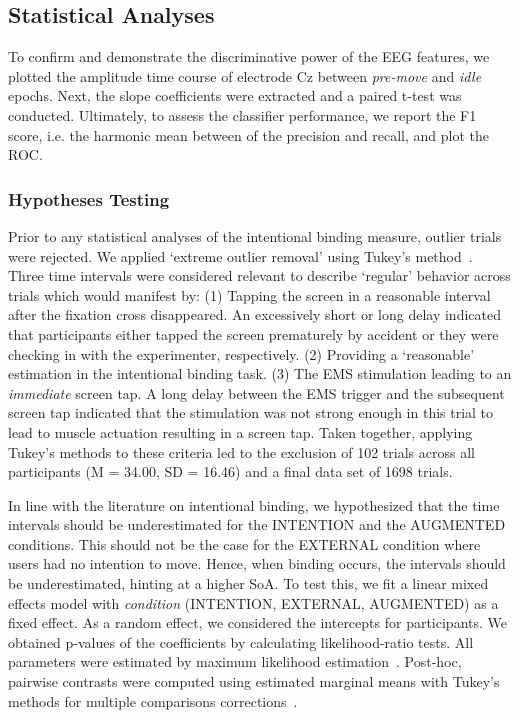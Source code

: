 \subsection{Statistical Analyses}
To confirm and demonstrate the discriminative power of the EEG features, we plotted the amplitude time course of electrode Cz between \textit{pre-move} and \textit{idle} epochs. Next, the slope coefficients were extracted and a paired t-test was conducted. Ultimately, to assess the classifier performance, we report the F1 score, i.e. the harmonic mean between of the precision and recall, and plot the ROC.

\subsubsection{Hypotheses Testing}
Prior to any statistical analyses of the intentional binding measure, outlier trials were rejected. We applied `extreme outlier removal' using Tukey's method~\cite{Tukey1949-sl}. Three time intervals were considered relevant to describe `regular' behavior across trials which would manifest by: (1) Tapping the screen in a reasonable interval after the fixation cross disappeared. An excessively short or long delay indicated that participants either tapped the screen prematurely by accident or they were checking in with the experimenter, respectively. (2) Providing a `reasonable' estimation in the intentional binding task. (3) The EMS stimulation leading to an \textit{immediate} screen tap. A long delay between the EMS trigger and the subsequent screen tap indicated that the stimulation was not strong enough in this trial to lead to muscle actuation resulting in a screen tap. Taken together, applying Tukey's methods to these criteria led to the exclusion of 102 trials across all participants (M = 34.00, SD = 16.46) and a final data set of 1698 trials.

In line with the literature on intentional binding, we hypothesized that the time intervals should be underestimated for the INTENTION and the AUGMENTED conditions. This should not be the case for the EXTERNAL condition where users had no intention to move. Hence, when binding occurs, the intervals should be underestimated, hinting at a higher SoA. To test this, we fit a linear mixed effects model with \textit{condition} (INTENTION, EXTERNAL, AUGMENTED) as a fixed effect. As a random effect, we considered the intercepts for participants. We obtained p-values of the coefficients by calculating likelihood-ratio tests. All parameters were estimated by maximum likelihood estimation~\cite[see][]{Pinheiro2006-bk}. Post-hoc, pairwise contrasts were computed using estimated marginal means with Tukey's methods for multiple comparisons corrections~\cite{Lenth2020-xk}.

